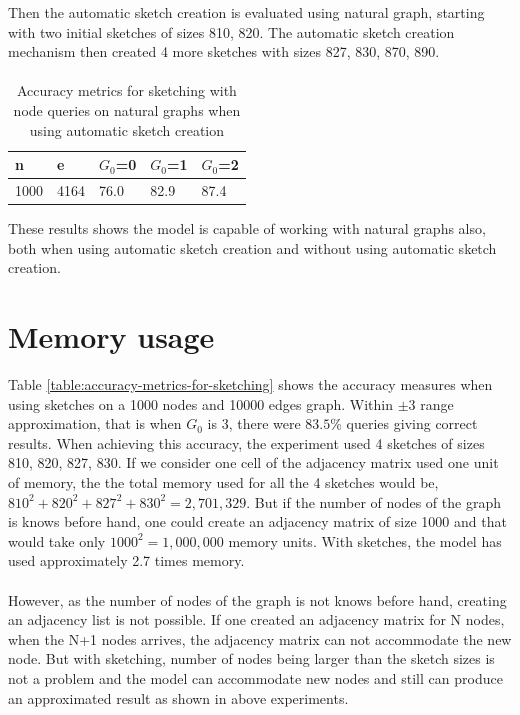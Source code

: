 \documentclass[12pt]{report}
\numberwithin{figure}{section}
\numberwithin{table}{section}
\begin{document}
Then the automatic sketch creation is evaluated using natural graph, starting with two initial sketches of sizes 810, 820. The automatic sketch creation mechanism then created 4 more sketches with sizes 827, 830, 870, 890.

\paragraph{}
 
\begin{table}[H]
\centering
\begin{tabular}{|l|l|l|l|l|}
\hline
n    & e     & $G_0$=0 & $G_0$=1 & $G_0$=2 \\ \hline
1000 & 4164  & 76.0   & 82.9  & 87.4  \\ \hline
\end{tabular}
\caption{Accuracy metrics for sketching with node queries on natural graphs when using automatic sketch creation}
\end{table}

These results shows the model is capable of working with natural graphs also, both when using automatic sketch creation and without using automatic sketch creation.

\section{Memory usage}
Table \ref{table:accuracy-metrics-for-sketching} shows the accuracy measures when using sketches on a 1000 nodes and 10000 edges graph. Within $\pm3$ range approximation, that is when $G_0$ is 3, there were $83.5\%$ queries giving correct results. When achieving this accuracy, the experiment used 4 sketches of sizes 810, 820, 827, 830. If we consider one cell of the adjacency matrix used one unit of memory, the the total memory used for all the 4 sketches would be, $810^2+820^2+827^2+830^2 = 2,701,329$. But if the number of nodes of the graph is knows before hand, one could create an adjacency matrix of size 1000 and that would take only $1000^2 = 1,000,000$ memory units. With sketches, the model has used approximately  2.7 times memory. 

\paragraph{}

However, as the number of nodes of the graph is not knows before hand, creating an adjacency list is not possible. If one created an adjacency matrix for N nodes, when the N+1 nodes arrives, the adjacency matrix can not accommodate the new node. But with sketching, number of nodes being larger than the sketch sizes is not a problem and the model can accommodate new nodes and still can produce an approximated result as shown in above experiments. 
\end{document}
